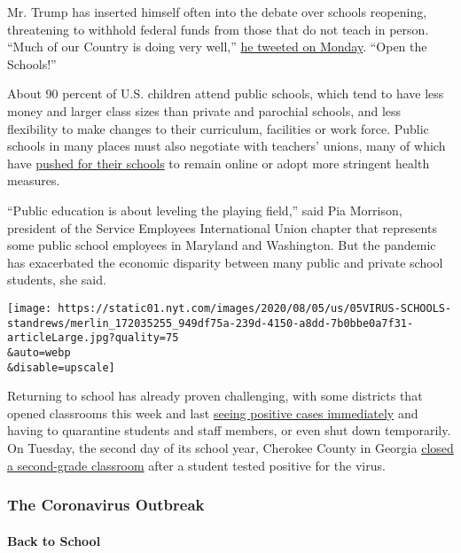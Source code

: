 Mr. Trump has inserted himself often into the debate over schools
reopening, threatening to withhold federal funds from those that do not
teach in person. ``Much of our Country is doing very well,''
\href{https://twitter.com/realDonaldTrump/status/1290257055534551043}{he
tweeted on Monday}. ``Open the Schools!''

About 90 percent of U.S. children attend public schools, which tend to
have less money and larger class sizes than private and parochial
schools, and less flexibility to make changes to their curriculum,
facilities or work force. Public schools in many places must also
negotiate with teachers' unions, many of which have
\href{https://www.nytimes.com/2020/07/29/us/teacher-union-school-reopening-coronavirus.html}{pushed
for their schools} to remain online or adopt more stringent health
measures.

``Public education is about leveling the playing field,'' said Pia
Morrison, president of the Service Employees International Union chapter
that represents some public school employees in Maryland and Washington.
But the pandemic has exacerbated the economic disparity between many
public and private school students, she said.

\texttt{[image: https://static01.nyt.com/images/2020/08/05/us/05VIRUS-SCHOOLS-standrews/merlin\_172035255\_949df75a-239d-4150-a8dd-7b0bbe0a7f31-articleLarge.jpg?quality=75\\\&auto=webp\\\&disable=upscale]}

Returning to school has already proven challenging, with some districts
that opened classrooms this week and last
\href{https://www.nytimes.com/2020/08/03/us/school-closing-coronavirus.html}{seeing
positive cases immediately} and having to quarantine students and staff
members, or even shut down temporarily. On Tuesday, the second day of
its school year, Cherokee County in Georgia
\href{https://www.ajc.com/education/cherokee-quarantines-second-grade-class-after-student-tests-positive-for-covid-19/OTD5MJKSFVFXFGPMHXUBG3INBQ/}{closed
a second-grade classroom} after a student tested positive for the virus.

\hypertarget{the-coronavirus-outbreak}{%
\subsubsection{The Coronavirus
Outbreak}\label{the-coronavirus-outbreak}}

\hypertarget{back-to-school}{%
\paragraph{Back to School}\label{back-to-school}}

